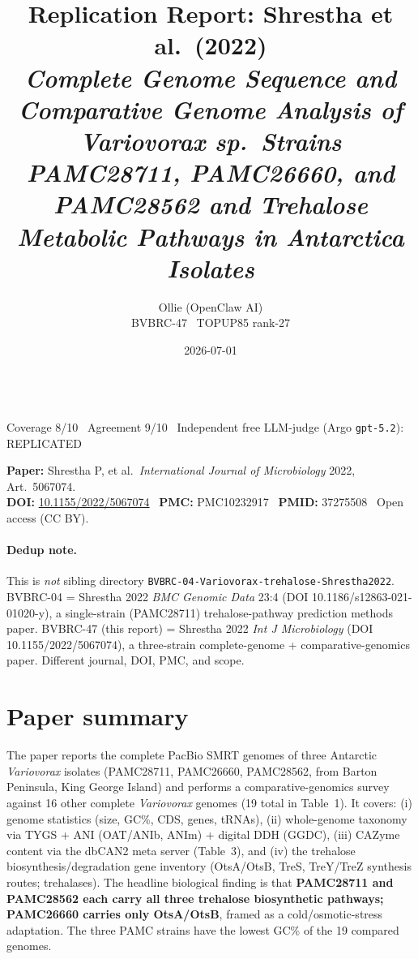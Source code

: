 \documentclass[11pt]{article}
\title{Replication Report: Shrestha et al.\ (2022)\\
\emph{Complete Genome Sequence and Comparative Genome Analysis of Variovorax sp.\ Strains PAMC28711, PAMC26660, and PAMC28562 and Trehalose Metabolic Pathways in Antarctica Isolates}}
\author{Ollie (OpenClaw AI) \\ BVBRC-47 \textperiodcentered\ TOPUP85 rank-27}
\date{2026-07-01}
\begin{document}
\maketitle

\begin{center}
\\[2pt]
\small Coverage 8/10 \textperiodcentered\ Agreement 9/10 \textperiodcentered\ Independent free LLM-judge (Argo \texttt{gpt-5.2}): REPLICATED
\end{center}

\textbf{Paper:} Shrestha P, et al.\ \emph{International Journal of Microbiology} 2022, Art.\ 5067074.\\
\textbf{DOI:} \href{https://doi.org/10.1155/2022/5067074}{10.1155/2022/5067074} \textperiodcentered\ \textbf{PMC:} PMC10232917 \textperiodcentered\ \textbf{PMID:} 37275508 \textperiodcentered\ Open access (CC BY).

\paragraph{Dedup note.}
This is \emph{not} sibling directory \texttt{BVBRC-04-Variovorax-trehalose-Shrestha2022}. BVBRC-04 = Shrestha 2022 \emph{BMC Genomic Data} 23:4 (DOI 10.1186/s12863-021-01020-y), a single-strain (PAMC28711) trehalose-pathway prediction methods paper. BVBRC-47 (this report) = Shrestha 2022 \emph{Int J Microbiology} (DOI 10.1155/2022/5067074), a three-strain complete-genome + comparative-genomics paper. Different journal, DOI, PMC, and scope.

\section{Paper summary}

The paper reports the complete PacBio SMRT genomes of three Antarctic \emph{Variovorax} isolates
(PAMC28711, PAMC26660, PAMC28562, from Barton Peninsula, King George Island) and performs a
comparative-genomics survey against 16 other complete \emph{Variovorax} genomes (19 total in Table~1).
It covers: (i) genome statistics (size, GC\%, CDS, genes, tRNAs), (ii) whole-genome taxonomy via
TYGS + ANI (OAT/ANIb, ANIm) + digital DDH (GGDC), (iii) CAZyme content via the dbCAN2 meta server
(Table~3), and (iv) the trehalose biosynthesis/degradation gene inventory (OtsA/OtsB, TreS,
TreY/TreZ synthesis routes; trehalases). The headline biological finding is that
\textbf{PAMC28711 and PAMC28562 each carry all three trehalose biosynthetic pathways;
PAMC26660 carries only OtsA/OtsB}, framed as a cold/osmotic-stress adaptation. The three PAMC
strains have the lowest GC\% of the 19 compared genomes.
\end{document}
